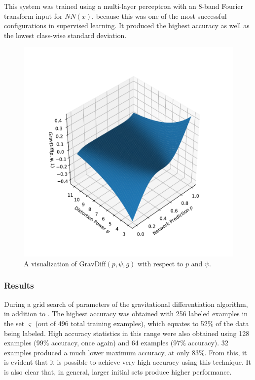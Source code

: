 \documentclass[10pt]{article}
\begin{document}
This system was trained using a multi-layer perceptron with an 8-band Fourier transform input for $NN(x)$, because this was one of the most successful configurations in supervised learning. It produced the highest accuracy as well as the lowest class-wise standard deviation.

\begin{figure}[H]
    \centering
    \includegraphics[width=\textwidth]{grav_diff}
    \caption{\label{grav_diff} A visualization of $\mathrm{GravDiff}(p, \psi, g)$ with respect to $p$ and $\psi$.}
\end{figure}

\subsubsection{Results}

During a grid search of parameters of the gravitational differentiation algorithm, in addition to . The highest accuracy was obtained with 256 labeled examples in the set $\varsigma$ (out of 496 total training examples), which equates to 52\% of the data being labeled. High accuracy statistics in this range were also obtained using 128 examples (99\% accuracy, once again) and 64 examples (97\% accuracy). 32 examples produced a much lower maximum accuracy, at only 83\%. From this, it is evident that it is possible to achieve very high accuracy using this technique. It is also clear that, in general, larger initial sets produce higher performance.
\end{document}
